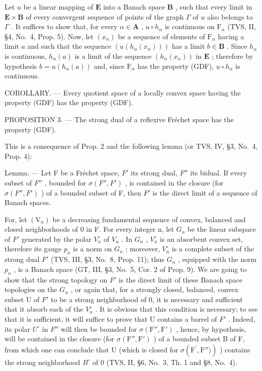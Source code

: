 Let \(u\) be a linear mapping of \(\mathbf{E}\) into a Banach space \(\mathbf{B}\) , such that every limit in \(\mathbf{E} \times \mathbf{B}\) of every convergent sequence of points of the graph \(\Gamma\) of \(u\) also belongs to \(\Gamma\) . It suffices to show that, for every \(\alpha \in \mathbf{A}\) , \(u \circ h_{\alpha}\) is continuous on \(\mathrm{F}_{\alpha}\) (TVS, II, §4, No.~4, Prop. 5). Now, let \((x_n)\) be a sequence of elements of \(\mathrm{F}_{\alpha}\) having a limit \(a\) and such that the sequence \(\left(u(h_{\alpha}(x_n))\right)\) has a limit \(b \in \mathbf{B}\) . Since \(h_{\alpha}\) is continuous, \(h_{\alpha}(a)\) is a limit of the sequence \((h_{\alpha}(x_n))\) in \(\mathbf{E}\) ; therefore by hypothesis \(b = u(h_{\alpha}(a))\) and, since \(\mathrm{F}_{\alpha}\) has the property (GDF), \(u \circ h_{\alpha}\) is continuous.

COROLLARY. --- Every quotient space of a locally convex space having the property (GDF) has the property (GDF).

PROPOSITION 3. --- The strong dual of a reflexive Fréchet space has the property (GDF).

This is a consequence of Prop. 2 and the following lemma (or TVS, IV, §3, No.~4, Prop. 4):

Lemma. --- Let F be a Fréchet space, \(F'\) its strong dual, \(F''\) its bidual. If every subset of \(F''\) , bounded for \(\sigma(F'', F')\) , is contained in the closure (for \(\sigma(F'', F')\) ) of a bounded subset of F, then \(F'\) is the direct limit of a sequence of Banach spaces.

For, let \((\mathrm{V}_{n})\) be a decreasing fundamental sequence of convex, balanced and closed neighborhoods of 0 in F. For every integer n, let \(G_{n}\) be the linear subspace of \(F'\) generated by the polar \(V_{n}^{\circ}\) of \(V_{n}\) . In \(G_{n}\) , \(V_{n}^{\circ}\) is an absorbent convex set, therefore its gauge \(p_{n}\) is a norm on \(G_{n}\) ; moreover, \(V_{n}^{\circ}\) is a complete subset of the strong dual \(F'\) (TVS, III, §3, No.~8, Prop. 11); thus \(G_{n}\) , equipped with the norm \(p_{n}\) , is a Banach space (GT, III, §3, No.~5, Cor. 2 of Prop. 9). We are going to show that the strong topology on \(F'\) is the direct limit of these Banach space topologies on the \(G_{n}\) , or again that, for a strongly closed, balanced, convex subset U of \(F'\) to be a strong neighborhood of 0, it is necessary and sufficient that it absorb each of the \(V_{n}^{\circ}\) . It is obvious that this condition is necessary; to see that it is sufficient, it will suffice to prove that U contains a barrel of \(F'\) . Indeed, its polar \(U^{\circ}\) in \(F''\) will then be bounded for \(\sigma(\mathrm{F}''\mathrm{,}\mathrm{F}')\) , hence, by hypothesis, will be contained in the closure (for \(\sigma(\mathrm{F}''\mathrm{,}\mathrm{F}')\) ) of a bounded subset B of F, from which one can conclude that U (which is closed for \(\sigma(\mathrm{F}^{\prime},\mathrm{F}''\mathrm{)})\) ) contains the strong neighborhood \(B^{\circ}\) of 0 (TVS, II, §6, No.~3, Th. 1 and §8, No.~4).

